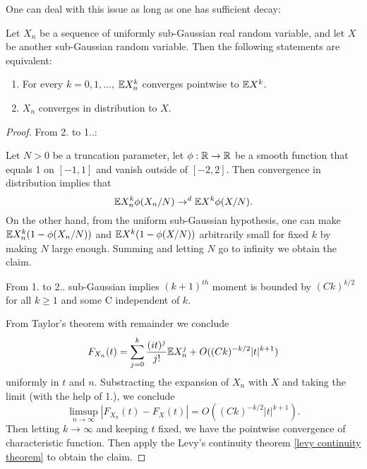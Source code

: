 One can deal with this issue as long as one has sufficient decay:

\begin{theorem}
    \label{carlman continuity theorem}
    Let $X_n$ be a sequence of uniformly sub-Gaussian real random variable, and let $X$ be another sub-Gaussian random variable. Then the following statements are equivalent:
    \begin{enumerate}
        \item For every $k=0,1,\dots$, $\mathbb{E} X_n^k$ converges pointwise to $\mathbb{E} X^k$.
        \item $X_n$ converges in distribution to $X$.
    \end{enumerate}
\end{theorem}

\begin{proof}
    From 2. to 1..:

    Let $N>0$ be a truncation parameter, let $\phi :\mathbb{R} \to \mathbb{R}$ be a smooth function that equals 1 on $[-1,1]$ and vanish outside of $[-2,2]$. Then convergence in distribution implies that
    \begin{equation*}
        \mathbb{E} X_n^k \phi (X_n/N) \to^d \mathbb{E} X^k\phi(X/N).
    \end{equation*}
    On the other hand, from the uniform sub-Gaussian hypothesis, one can make $\mathbb{E} X_n^k(1-\phi(X_n/N))$ and $\mathbb{E} X^k(1-\phi(X/N))$ arbitrarily small for fixed $k$ by making $N$ large enough. 
    Summing and letting $N$ go to infinity we obtain the claim.

    From 1. to 2..
    sub-Gaussian implies $(k+1)^{th}$ moment is bounded by $(Ck)^{k/2}$ for all $k\geq 1$ and some C independent of $k$. 

    From Taylor's theorem with remainder we conclude
    \begin{equation*}
        F_{X_n}(t) = \sum_{j=0}^k \frac{(it)^j}{j!}\mathbb{E} X_n^j +O((Ck)^{-k/2}|t|^{k+1})
    \end{equation*}
    uniformly in $t$ and $n$. Substracting the expansion of $X_n$ with $X$ and taking the limit (with the help of 1.), we conclude
    \begin{equation*}
        \limsup_{n\to \infty} |F_{X_n}(t)-F_X(t)| = O((Ck)^{-k/2}|t|^{k+1}).
    \end{equation*}
    Then letting $k\to \infty$ and keeping $t$ fixed, we have the pointwise convergence of characteristic function. Then apply the Levy's continuity theorem \ref{levy continuity theorem} to obtain the claim.
\end{proof}

